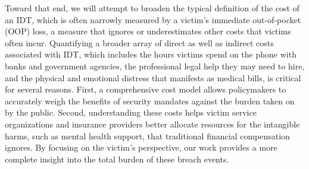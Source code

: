 Toward that end, we will attempt to broaden the typical definition of the cost of an IDT, which is often narrowly measured by a victim's immediate out-of-pocket (OOP) loss, a measure that ignores or underestimates other costs that victims often incur. Quantifying a broader array of direct as well as indirect costs associated with IDT, which includes the hours victims spend on the phone with banks and government agencies, the professional legal help they may need to hire, and the physical and emotional distress that manifests as medical bills, is critical for several reasons. First, a comprehensive cost model allows policymakers to accurately weigh the benefits of security mandates against the burden taken on by the public. Second, understanding these costs helps victim service organizations and insurance providers better allocate resources for the intangible harms, such as mental health support, that traditional financial compensation ignores. By focusing on the victim's perspective, our work provides a more complete insight into the total burden of these breach events. 







